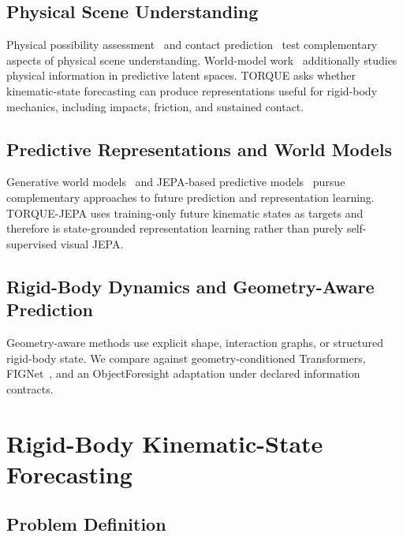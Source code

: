 \documentclass{article}
\begin{document}
\subsection{Physical Scene Understanding}

Physical possibility assessment~\cite{riochet_intphys_2020,bordes_intphys_2025} and contact prediction~\cite{bear_physion_2022,tung_physion_2023} test complementary aspects of physical scene understanding. World-model work~\cite{chen_vl-jepa_2025,assran_v-jepa_2025,maes_leworldmodel_2026} additionally studies physical information in predictive latent spaces. TORQUE asks whether kinematic-state forecasting can produce representations useful for rigid-body mechanics, including impacts, friction, and sustained contact.

\subsection{Predictive Representations and World Models}

Generative world models~\cite{nvidia_cosmos_2025,nvidia_cosmos_2026} and JEPA-based predictive models~\cite{chen_vl-jepa_2025,maes_leworldmodel_2026} pursue complementary approaches to future prediction and representation learning. TORQUE-JEPA uses training-only future kinematic states as targets and therefore is state-grounded representation learning rather than purely self-supervised visual JEPA.

\subsection{Rigid-Body Dynamics and Geometry-Aware Prediction}

Geometry-aware methods use explicit shape, interaction graphs, or structured rigid-body state. We compare against geometry-conditioned Transformers, FIGNet~\cite{allen_fignet_2022}, and an ObjectForesight adaptation under declared information contracts.

\section{Rigid-Body Kinematic-State Forecasting}

\subsection{Problem Definition}
\end{document}
